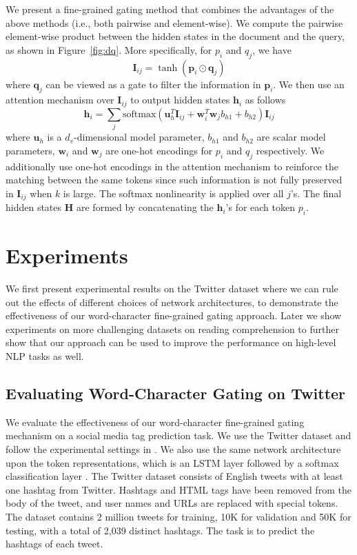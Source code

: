 \documentclass{article} \usepackage{iclr2017_conference,times}
\begin{document}
We present a fine-grained gating method that combines the advantages of the above methods (i.e., both pairwise and element-wise). We compute the pairwise element-wise product between the hidden states in the document and the query, as shown in Figure~\ref{fig:dq}. More specifically, for $p_i$ and $q_j$, we have
\[
\mathbf{I}_{ij} = \tanh(\mathbf{p}_i \odot \mathbf{q}_j)
\]
where $\mathbf{q}_j$ can be viewed as a gate to filter the information in $\mathbf{p}_i$. We then use an attention mechanism over $\mathbf{I}_{ij}$ to output hidden states $\mathbf{h}_i$ as follows
\[
\mathbf{h}_i = \sum_j  \mbox{softmax}(\mathbf{u}_h^T \mathbf{I}_{ij} + \mathbf{w}_i^T \mathbf{w}_j b_{h1} + b_{h2}) \mathbf{I}_{ij}
\]
where $\mathbf{u}_h$ is a $d_v$-dimensional model parameter, $b_{h1}$ and $b_{h2}$ are scalar model parameters, $\mathbf{w}_i$ and $\mathbf{w}_j$ are one-hot encodings for $p_i$ and $q_j$ respectively. We additionally use one-hot encodings in the attention mechanism to reinforce the matching between the same tokens since such information is not fully preserved in $\mathbf{I}_{ij}$ when $k$ is large. The softmax nonlinearity is applied over all $j$'s. The final hidden states $\mathbf{H}$ are formed by concatenating the $\mathbf{h}_i$'s for each token $p_i$.




 \section{Experiments}

We first present experimental results on the Twitter dataset where we can rule out the effects of different choices of network architectures, to demonstrate the effectiveness of our word-character fine-grained gating approach. Later we show experiments on more challenging datasets on reading comprehension to further show that our approach can be used to improve the performance on high-level NLP tasks as well.

\subsection{Evaluating Word-Character Gating on Twitter}

We evaluate the effectiveness of our word-character fine-grained gating mechanism on a social media tag prediction task.
We use the Twitter dataset and follow the experimental settings in \cite{dhingra2016tweet2vec}. We also use the same network architecture upon the token representations, which is an LSTM layer followed by a softmax classification layer \citep{dhingra2016tweet2vec}. The Twitter dataset consists of English tweets with at least one hashtag from Twitter. Hashtags and HTML tags have been removed from the body of the tweet, and user names and URLs are replaced with special tokens. The dataset contains 2 million tweets for training, 10K for validation and 50K for testing, with a total of 2,039 distinct hashtags. The task is to predict the hashtags of each tweet.
\end{document}
